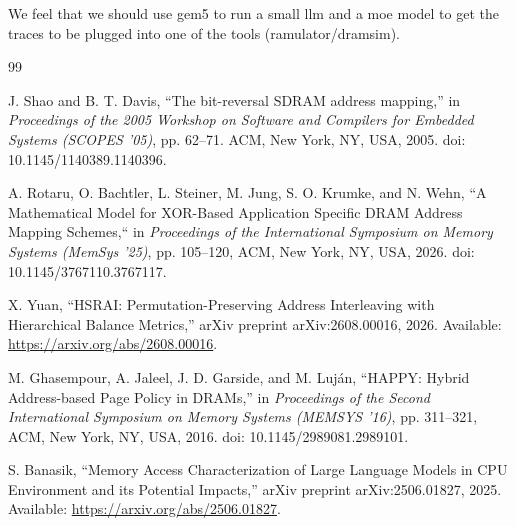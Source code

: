 \documentclass{article}
\begin{document}
We feel that we should use gem5 to run a small llm and a moe model to get the traces to be plugged into one of the tools (ramulator/dramsim).


\begin{thebibliography}{99}

J. Shao and B. T. Davis,
``The bit-reversal SDRAM address mapping,''
in \textit{Proceedings of the 2005 Workshop on Software and Compilers
for Embedded Systems (SCOPES '05)}, pp. 62--71.
ACM, New York, NY, USA, 2005.
doi: 10.1145/1140389.1140396.

A. Rotaru, O. Bachtler, L. Steiner, M. Jung, S. O. Krumke, and N. Wehn,
``A Mathematical Model for XOR-Based Application Specific DRAM Address Mapping Schemes,``
in \textit{Proceedings of the International Symposium on Memory Systems (MemSys '25)},
pp. 105--120, ACM, New York, NY, USA, 2026.
doi: 10.1145/3767110.3767117.

X. Yuan,
``HSRAI: Permutation-Preserving Address Interleaving with Hierarchical Balance Metrics,''
arXiv preprint arXiv:2608.00016, 2026.
Available: \url{https://arxiv.org/abs/2608.00016}.

M. Ghasempour, A. Jaleel, J. D. Garside, and M. Luján,
``HAPPY: Hybrid Address-based Page Policy in DRAMs,''
in \textit{Proceedings of the Second International Symposium on Memory Systems (MEMSYS '16)},
pp. 311--321, ACM, New York, NY, USA, 2016.
doi: 10.1145/2989081.2989101.

S. Banasik,
``Memory Access Characterization of Large Language Models in CPU Environment and its Potential Impacts,''
arXiv preprint arXiv:2506.01827, 2025.
Available: \url{https://arxiv.org/abs/2506.01827}.

\end{thebibliography}
\end{document}
